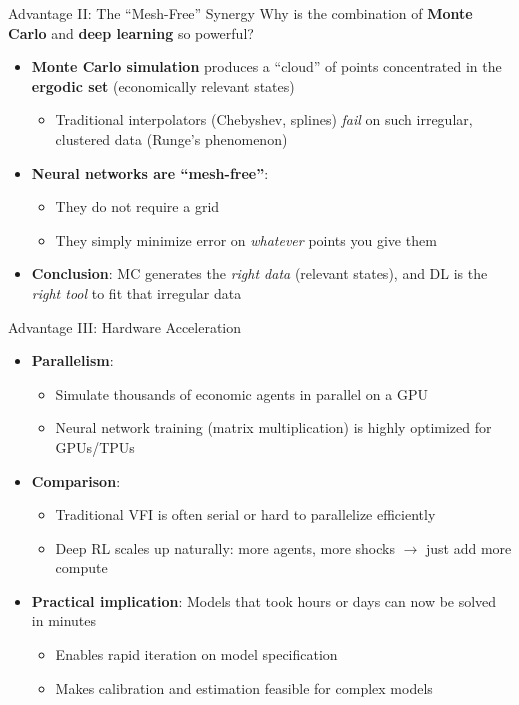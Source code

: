 \documentclass[10pt,english,aspectratio=169]{beamer}
\begin{document}
\begin{frame}{Advantage II: The ``Mesh-Free'' Synergy}
Why is the combination of \textbf{Monte Carlo} and \textbf{deep learning} so powerful?

\begin{itemize}
  \item \textbf{Monte Carlo simulation} produces a ``cloud'' of points concentrated in the \textbf{ergodic set} (economically relevant states)
    \begin{itemize}
      \item Traditional interpolators (Chebyshev, splines) \emph{fail} on such irregular, clustered data (Runge's phenomenon)
    \end{itemize}
  \medskip
  \item \textbf{Neural networks are ``mesh-free''}:
    \begin{itemize}
      \item They do not require a grid
      \item They simply minimize error on \emph{whatever} points you give them
    \end{itemize}
  \medskip
  \item \textbf{Conclusion}: MC generates the \emph{right data} (relevant states), and DL is the \emph{right tool} to fit that irregular data
\end{itemize}
\end{frame}

\begin{frame}{Advantage III: Hardware Acceleration}
\begin{itemize}
  \item \textbf{Parallelism}:
    \begin{itemize}
      \item Simulate thousands of economic agents in parallel on a GPU
      \item Neural network training (matrix multiplication) is highly optimized for GPUs/TPUs
    \end{itemize}
  \medskip
  \item \textbf{Comparison}:
    \begin{itemize}
      \item Traditional VFI is often serial or hard to parallelize efficiently
      \item Deep RL scales up naturally: more agents, more shocks $\to$ just add more compute
    \end{itemize}
  \medskip
  \item \textbf{Practical implication}: Models that took hours or days can now be solved in minutes
    \begin{itemize}
      \item Enables rapid iteration on model specification
      \item Makes calibration and estimation feasible for complex models
    \end{itemize}
\end{itemize}
\end{frame}
\end{document}
